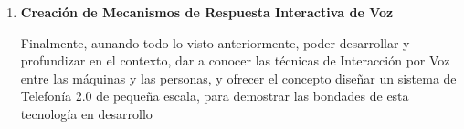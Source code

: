 \begin{enumerate}
\item \textbf{Creación de Mecanismos de Respuesta Interactiva de Voz} 

Finalmente, aunando todo lo visto anteriormente, poder desarrollar y profundizar en el contexto, dar a conocer las técnicas de Interacción por Voz entre las máquinas y las personas, y ofrecer el concepto diseñar un sistema de Telefonía 2.0 de pequeña escala, para demostrar las bondades de esta tecnología en desarrollo

\end{enumerate}
